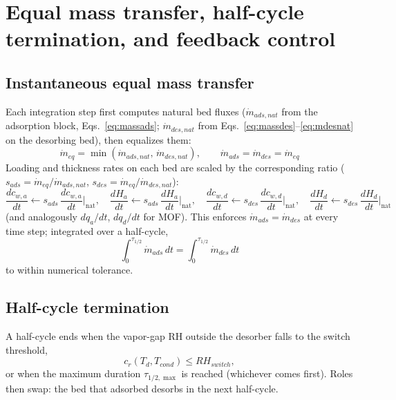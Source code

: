 \documentclass[11pt]{article}
\begin{document}
\section{Equal mass transfer, half-cycle termination, and feedback control}

\subsection{Instantaneous equal mass transfer}

Each integration step first computes natural bed fluxes
($\dot{m}_{ads,nat}$ from the adsorption block, Eqs.~\eqref{eq:massads};
$\dot{m}_{des,nat}$ from Eqs.~\eqref{eq:massdes}--\eqref{eq:mdesnat} on the desorbing bed),
then equalizes them:
\begin{equation}
\dot{m}_{eq} = \min(\dot{m}_{ads,nat},\, \dot{m}_{des,nat}),
\qquad
\dot{m}_{ads} = \dot{m}_{des} = \dot{m}_{eq}
\label{eq:equal_mass}
\end{equation}
Loading and thickness rates on each bed are scaled by the corresponding ratio
($s_{ads} = \dot{m}_{eq}/\dot{m}_{ads,nat}$, $s_{des} = \dot{m}_{eq}/\dot{m}_{des,nat}$):
\begin{equation}
\frac{dc_{w,a}}{dt} \leftarrow s_{ads}\,\frac{dc_{w,a}}{dt}\Big|_{\mathrm{nat}},
\quad
\frac{dH_a}{dt} \leftarrow s_{ads}\,\frac{dH_a}{dt}\Big|_{\mathrm{nat}},
\quad
\frac{dc_{w,d}}{dt} \leftarrow s_{des}\,\frac{dc_{w,d}}{dt}\Big|_{\mathrm{nat}},
\quad
\frac{dH_d}{dt} \leftarrow s_{des}\,\frac{dH_d}{dt}\Big|_{\mathrm{nat}}
\label{eq:equal_scale}
\end{equation}
(and analogously $dq_a/dt$, $dq_d/dt$ for MOF).
This enforces $\dot{m}_{ads} = \dot{m}_{des}$ at every time step; integrated over a half-cycle,
\begin{equation}
\int_0^{\tau_{1/2}} \dot{m}_{ads}\,dt = \int_0^{\tau_{1/2}} \dot{m}_{des}\,dt
\label{eq:cycle}
\end{equation}
to within numerical tolerance.

\subsection{Half-cycle termination}

A half-cycle ends when the vapor-gap RH outside the desorber falls to the switch threshold,
\begin{equation}
c_r(T_d, T_{cond}) \le RH_{switch},
\label{eq:rh_switch}
\end{equation}
or when the maximum duration $\tau_{1/2,\max}$ is reached (whichever comes first).
Roles then swap: the bed that adsorbed desorbs in the next half-cycle.
\end{document}
